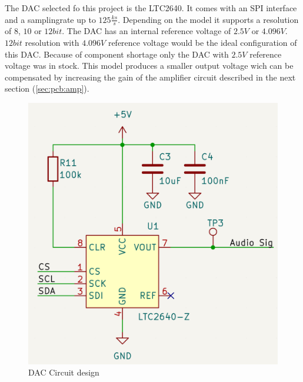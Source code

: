 %
The DAC selected fo this project is the LTC2640. It comes with an SPI interface and a samplingrate up to $125\frac{ks}{s}$. Depending on the model it supports a resolution of $8$, $10$ or $12bit$. The DAC has an internal reference voltage of $2.5V$ or $4.096V$. $12bit$ resolution with $4.096V$ reference voltage would be the ideal configuration of this DAC. Because of component shortage only the DAC with $2.5V$ reference voltage was in stock. This model produces a smaller output voltage wich can be compensated by increasing the gain of the amplifier circuit described in the next section (\ref{sec:pcb:amp}).
%
\begin{figure}
  \centering
  \includegraphics[height=\mediumheight]{src/assets/pictures/circuit/dac_circuit.png}
  \caption{DAC Circuit design}\label{fig:pcb:dac_circuit}
\end{figure}